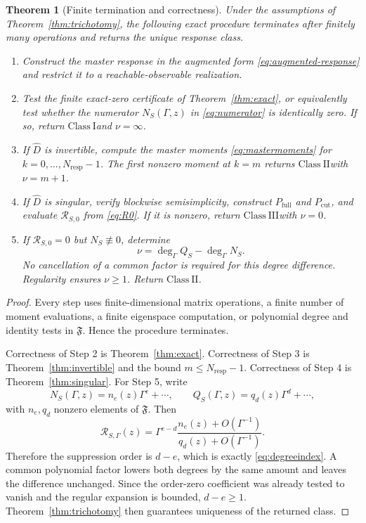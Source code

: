 \documentclass[11pt]{article}
\newtheorem{theorem}{Theorem}[section]
\theoremstyle{definition}
\theoremstyle{remark}
\theoremstyle{plain}
\newcommand{\R}{\mathcal R}
\newcommand{\full}{\mathrm{full}}
\newcommand{\cut}{\mathrm{cut}}
\newcommand{\resp}{\mathrm{resp}}
\newcommand{\ClassI}{\ensuremath{\mathrm{Class\ I}}}
\newcommand{\ClassII}{\ensuremath{\mathrm{Class\ II}}}
\newcommand{\ClassIII}{\ensuremath{\mathrm{Class\ III}}}
\begin{document}
\begin{theorem}[Finite termination and correctness]\label{thm:algorithm}
Under the assumptions of Theorem~\ref{thm:trichotomy}, the following exact procedure terminates after finitely many operations and returns the unique response class.

\begin{enumerate}[label=\textbf{Step \arabic*.},leftmargin=16mm]
 \item Construct the master response in the augmented form \eqref{eq:augmented-response} and restrict it to a reachable-observable realization.
 \item Test the finite exact-zero certificate of Theorem~\ref{thm:exact}, or equivalently test whether the numerator $N_S(\Gamma,z)$ in \eqref{eq:numerator} is identically zero.  If so, return \ClassI and $\nu=\infty$.
 \item If $\widehat D$ is invertible, compute the master moments \eqref{eq:mastermoments} for $k=0,\ldots,N_{\resp}-1$.  The first nonzero moment at $k=m$ returns \ClassII with $\nu=m+1$.
 \item If $\widehat D$ is singular, verify blockwise semisimplicity, construct $P_{\full}$ and $P_{\cut}$, and evaluate $\R_{S,0}$ from \eqref{eq:R0}.  If it is nonzero, return \ClassIII with $\nu=0$.
 \item If $\R_{S,0}=0$ but $N_S\not\equiv0$, determine
 \begin{equation}\label{eq:degreeindex}
 \nu=\deg_{\Gamma}Q_S-\deg_{\Gamma}N_S.
 \end{equation}
 No cancellation of a common factor is required for this degree difference.
 Regularity ensures $\nu\ge1$.  Return \ClassII.
\end{enumerate}
\end{theorem}

\begin{proof}
Every step uses finite-dimensional matrix operations, a finite number of moment evaluations, a finite eigenspace computation, or polynomial degree and identity tests in $\mathfrak F$.  Hence the procedure terminates.

Correctness of Step 2 is Theorem~\ref{thm:exact}.  Correctness of Step 3 is Theorem~\ref{thm:invertible} and the bound $m\le N_{\resp}-1$.  Correctness of Step 4 is Theorem~\ref{thm:singular}.  For Step 5, write
\[
 N_S(\Gamma,z)=n_e(z)\Gamma^e+\cdots,\qquad
 Q_S(\Gamma,z)=q_d(z)\Gamma^d+\cdots,
\]
with $n_e,q_d$ nonzero elements of $\mathfrak F$.  Then
\[
 \R_{S,\Gamma}(z)=\Gamma^{e-d}\frac{n_e(z)+O(\Gamma^{-1})}
 {q_d(z)+O(\Gamma^{-1})}.
\]
Therefore the suppression order is $d-e$, which is exactly \eqref{eq:degreeindex}.  A common polynomial factor lowers both degrees by the same amount and leaves the difference unchanged.  Since the order-zero coefficient was already tested to vanish and the regular expansion is bounded, $d-e\ge1$.  Theorem~\ref{thm:trichotomy} then guarantees uniqueness of the returned class.
\end{proof}
\end{document}
